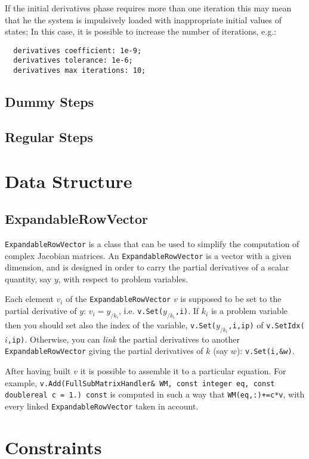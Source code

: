 \documentclass[10pt,dvips]{report}
\begin{document}
\noindent
If the initial derivatives phase requires
more than one iteration  
this may mean that he 
the system is impulsively loaded  with inappropriate 
initial values of states; 
In this case, it is possible to increase the number of iterations, e.g.:
\begin{verbatim}
  derivatives coefficient: 1e-9;
  derivatives tolerance: 1e-6;
  derivatives max iterations: 10; 
\end{verbatim}
\section{Dummy Steps}
\section{Regular Steps}

\chapter{Data Structure}
\section{ExpandableRowVector}
\texttt{ExpandableRowVector} is a class that can be used to
simplify the computation of complex Jacobian matrices.
An \texttt{ExpandableRowVector} is a vector with a given dimension,
and is designed in order to carry the partial derivatives
of a scalar quantity, say $y$, with respect to problem variables.

\noindent
Each element $v_i$ of the \texttt{ExpandableRowVector} $v$ 
is supposed to be set to the partial derivative
of $y$: $v_i = y_{/k_i}$, i.e. \texttt{v.Set($y_{/k_i}$,i)}.
If $k_i$ is a problem variable then you should set also
the index of the variable, \texttt{v.Set($y_{/k_i}$,i,ip)}
of \texttt{v.SetIdx($i$,ip)}. Otherwise, you can
\emph{link} the partial derivatives to another \texttt{ExpandableRowVector}
giving the partial derivatives of $k$ (say $w$): \texttt{v.Set(i,\&w)}.

\noindent
After having built $v$ it is possible to assemble it 
to a particular equation. For example,
\texttt{v.Add(FullSubMatrixHandler\& WM, const integer eq, const doublereal c = 1.) const}
is computed in such a way that \texttt{WM(eq,:)+=c*v}, with every linked 
\texttt{ExpandableRowVector} taken in account.

\chapter{Constraints}
\end{document}
